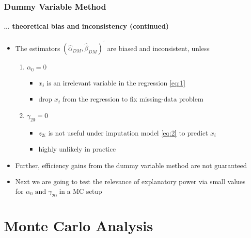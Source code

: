 \documentclass[aspectratio=1610]{beamer}
\begin{document}
\begin{frame}
	\frametitle{Dummy Variable Method}
	\framesubtitle{$\ldots$ theoretical bias and inconsistency (continued)}
	\begin{itemize}
		\item<1-> The estimators $(\hat{\alpha}_{DM}, \hat{\beta}_{DM})^{\prime}$ are biased and inconsistent, unless
		\begin{enumerate}
			\item<2-> $\alpha_0 = 0$
			\begin{itemize}
				\item<2-> $x_i$ is an irrelevant variable in the regression \eqref{eq:1}
				\item<2-> drop $x_i$ from the regression to fix missing-data problem
			\end{itemize}
			\item<3-> $\gamma_{20} = 0$
			\begin{itemize}
				\item<3-> $z_{2i}$ is not useful under imputation model \eqref{eq:2} to predict $x_i$
				\item<3-> highly unlikely in practice
			\end{itemize}
		\end{enumerate}
		\item<4-> Further, efficiency gains from the dummy variable method are not guaranteed
		\item<4-> Next we are going to test the relevance of explanatory power via small values for $\alpha_0 \text{ and } \gamma_{20}$ in a MC setup
	\end{itemize}
\end{frame}

\section{Monte Carlo Analysis}
\end{document}
